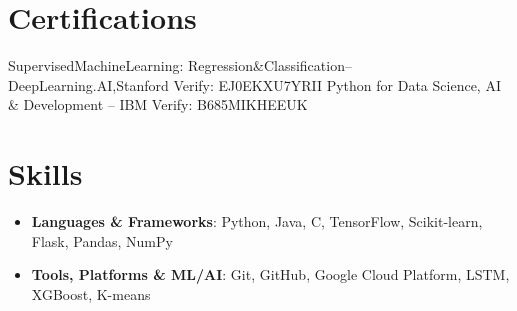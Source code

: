 \documentclass[letterpaper,11pt]{article}
\newcommand{\resumeSkillHeading}[2]{
  \vspace{-2pt}\item
  {\textbf{\small#1}}{: \small#2}
}
\newcommand{\resumeSubHeadingListStart}{\begin{itemize}[leftmargin=0.15in, label={}]}
\newcommand{\resumeSubHeadingListEnd}{\end{itemize}}
\begin{document}
\section{Certifications}
SupervisedMachineLearning: Regression\&Classification–DeepLearning.AI,Stanford Verify: EJ0EKXU7YRII
Python for Data Science, AI \& Development – IBM Verify: B685MIKHEEUK

\section{Skills}
\resumeSubHeadingListStart
  \resumeSkillHeading{Languages \& Frameworks}{Python, Java, C, TensorFlow, Scikit-learn, Flask, Pandas, NumPy}
  \resumeSkillHeading{Tools, Platforms \& ML/AI}{Git, GitHub, Google Cloud Platform, LSTM, XGBoost, K-means}
\resumeSubHeadingListEnd
\end{document}
